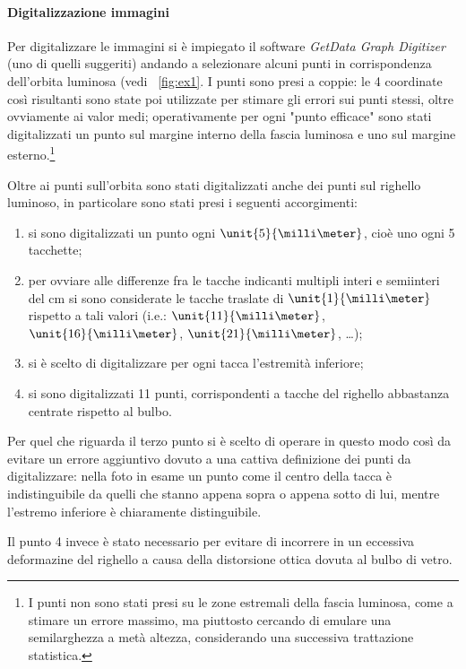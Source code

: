 \documentclass[10pt,a4paper]{article}
\begin{document}
\paragraph{Digitalizzazione immagini} Per digitalizzare le immagini si è impiegato il software \emph{GetData Graph Digitizer} (uno di quelli suggeriti) andando a selezionare alcuni punti in corrispondenza dell'orbita luminosa (vedi \figurename{~\ref{fig:ex1}}.
I punti sono presi a coppie: le 4 coordinate così risultanti sono state poi utilizzate per stimare gli errori sui punti stessi, oltre ovviamente ai valor medi; operativamente per ogni "punto efficace" sono stati digitalizzati un punto sul margine interno della fascia luminosa e uno sul margine esterno.\footnote{I punti non sono stati presi su le zone estremali della fascia luminosa, come a stimare un errore massimo, ma piuttosto cercando di emulare una semilarghezza a metà altezza, considerando una successiva trattazione statistica.}

Oltre ai punti sull'orbita sono stati digitalizzati anche dei punti sul righello luminoso, in particolare sono stati presi i seguenti accorgimenti:
\begin{enumerate}
	\item si sono digitalizzati un punto ogni $\unit{5}{\milli\meter}$, cioè uno ogni 5 tacchette;
	\item per ovviare alle differenze fra le tacche indicanti multipli interi e semiinteri del cm si sono considerate le tacche traslate di $\unit{1}{\milli\meter}$ rispetto a tali valori (i.e.: $\unit{11}{\milli\meter}$, $\unit{16}{\milli\meter}$, $\unit{21}{\milli\meter}$, \dots);
	\item si è scelto di digitalizzare per ogni tacca l'estremità inferiore;
	\item si sono digitalizzati 11 punti, corrispondenti a tacche del righello abbastanza centrate rispetto al bulbo.
\end{enumerate}

Per quel che riguarda il terzo punto si è scelto di operare in questo modo così da evitare un errore aggiuntivo dovuto a una cattiva definizione dei punti da digitalizzare: nella foto in esame un punto come il centro della tacca è indistinguibile da quelli che stanno appena sopra o appena sotto di lui, mentre l'estremo inferiore è chiaramente distinguibile.

Il punto 4 invece è stato necessario per evitare di incorrere in un eccessiva deformazine del righello a causa della distorsione ottica dovuta al bulbo di vetro.
\end{document}
